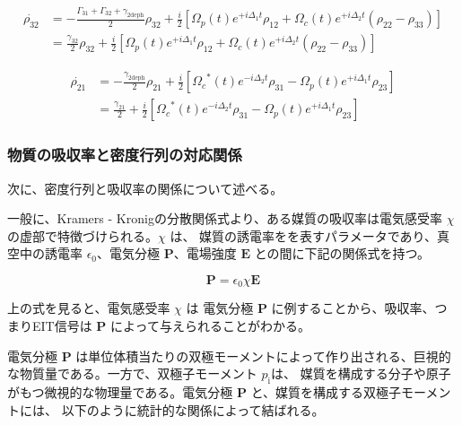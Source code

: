 \documentclass[11pt,a4paper]{ltjsarticle}
\begin{document}
\begin{align*}
  \label{off-diagonal 32}
  \dot{ \rho_{32} } &= - \frac{ \Gamma_{31} + \Gamma_{32} + \gamma_{2 \mathrm{deph}} }{2} \rho_{32}
                                                                           + \frac{i}{2} \left[\Omega_{p}(t) e^{+i \Delta_1 t} \rho_{12} +  \Omega_{c}(t) e^{+i \Delta_2 t} (\rho_{22} - \rho_{33}) \right]\\
                    &= \frac{ \gamma_{32}}{2} \rho_{32}
                                                                          + \frac{i}{2} \left[\Omega_{p}(t) e^{+i \Delta_1 t} \rho_{12} +  \Omega_{c}(t) e^{+i \Delta_2 t} (\rho_{22} - \rho_{33}) \right]
\end{align*}


\begin{align*}
  \dot{ \rho_{21} } &= - \frac{ \gamma_{2 \mathrm{deph}} }{2} \rho_{21}
                                                                           + \frac{i}{2} \left[{\Omega_{c}}^*(t) e^{-i \Delta_2 t} \rho_{31} - \Omega_{p}(t) e^{+i \Delta_1 t} \rho_{23} \right]\\
                    &= \frac{ \gamma_{21}}{2}
                                                                          + \frac{i}{2} \left[{\Omega_{c}}^*(t) e^{-i \Delta_2 t} \rho_{31} - \Omega_{p}(t) e^{+i \Delta_1 t} \rho_{23} \right]
\end{align*}





\subsubsection{物質の吸収率と密度行列の対応関係}
次に、密度行列と吸収率の関係について述べる。

一般に、Kramers - Kronigの分散関係式\cite{David_Jackson}より、ある媒質の吸収率は電気感受率 $\chi$ の虚部で特徴づけられる。$\chi$ は、
媒質の誘電率をを表すパラメータであり、真空中の誘電率 $\epsilon_{0}、$電気分極 $\mathbf{P}$、電場強度 $\mathbf{E}$ との間に下記の関係式を持つ。

\begin{equation*}
  \mathbf{P} = \epsilon_{0} \chi\mathbf{E} 
\end{equation*}

上の式を見ると、電気感受率 $\chi$ は 電気分極 $\mathbf{P}$ に例することから、吸収率、つまりEIT信号は $\mathbf{P}$ によって与えられることがわかる。

電気分極 $\mathbf{P}$ は単位体積当たりの双極モーメントによって作り出される、巨視的な物質量である。一方で、双極子モーメント $p_{\mathrm{i}}$は、
媒質を構成する分子や原子がもつ微視的な物理量である。電気分極  $\mathbf{P}$ と、媒質を構成する双極子モーメントには、
以下のように統計的な関係によって結ばれる。\cite{David_Jackson}
\end{document}
